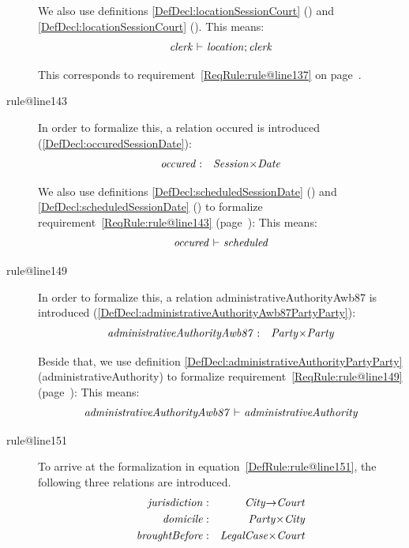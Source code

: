 \documentclass[10pt,a4paper]{report}              %
\theoremstyle{plain}\theorembodyfont{\rmfamily}\newtheorem{definition}{Definition}[section]
\theoremstyle{plain}\theorembodyfont{\rmfamily}\newtheorem{designrule}[definition]{Requirement}
\def\id#1{\mbox{\em #1\/}}
\begin{document}
\begin{description}
We also use definitions \ref{DefDecl:locationSessionCourt} ({}) and \ref{DefDecl:locationSessionCourt} ({}). 
This means: 
\begin{equation}
   {\id{clerk}}\ {\vdash}\ {\id{location}};{\id{clerk}}\label{DefRule:rule@line137}
\end{equation}

This corresponds to requirement~\ref{ReqRule:rule@line137} on page~\pageref{ReqRule:rule@line137}.
\item[rule@line143]
In order to formalize this, a relation
occured is introduced (\ref{DefDecl:occuredSessionDate}):
\begin{eqnarray}
   {\id{occured}}&:&{\id{Session}}{\times}{\id{Date}}\label{DefDecl:occuredSessionDate}
\end{eqnarray}

We also use definitions \ref{DefDecl:scheduledSessionDate} ({}) and \ref{DefDecl:scheduledSessionDate} ({}) to formalize requirement~\ref{ReqRule:rule@line143} (page~\pageref{ReqRule:rule@line143}):
This means: 
\begin{equation}
   {\id{occured}}\ {\vdash}\ {\id{scheduled}}\label{DefRule:rule@line143}
\end{equation}

\item[rule@line149]
In order to formalize this, a relation
administrativeAuthorityAwb87 is introduced (\ref{DefDecl:administrativeAuthorityAwb87PartyParty}):
\begin{eqnarray}
   {\id{administrativeAuthorityAwb87}}&:&{\id{Party}}{\times}{\id{Party}}\label{DefDecl:administrativeAuthorityAwb87PartyParty}
\end{eqnarray}

Beside that, we use definition \ref{DefDecl:administrativeAuthorityPartyParty}
(administrativeAuthority) to formalize requirement~\ref{ReqRule:rule@line149} (page~\pageref{ReqRule:rule@line149}):
This means: 
\begin{equation}
   {\id{administrativeAuthorityAwb87}}\ {\vdash}\ {\id{administrativeAuthority}}\label{DefRule:rule@line149}
\end{equation}

\item[rule@line151]
To arrive at the formalization in equation~\ref{DefRule:rule@line151}, the following three relations are introduced.
\begin{eqnarray}
   {\id{jurisdiction}}&:&{\id{City}}{\rightarrow}{\id{Court}}\label{DefDecl:jurisdictionCityCourt}\\
   {\id{domicile}}&:&{\id{Party}}{\times}{\id{City}}\label{DefDecl:domicilePartyCity}\\
   {\id{broughtBefore}}&:&{\id{LegalCase}}{\times}{\id{Court}}\label{DefDecl:broughtBeforeLegalCaseCourt}
\end{eqnarray}


\end{description}
\end{document}
